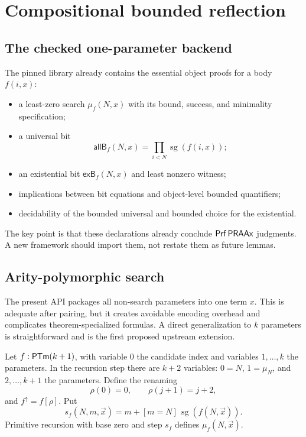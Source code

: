 \section{Compositional bounded reflection}\label{sec:reflection}

\subsection{The checked one-parameter backend}

The pinned library already contains the essential object proofs for a body \(f(i,x)\):

\begin{itemize}
\item a least-zero search \(\mu_f(N,x)\) with its bound, success, and minimality specification;
\item a universal bit
\[
 \mathsf{allB}_f(N,x)=\prod_{i<N}\operatorname{sg}(f(i,x));
\]
\item an existential bit \(\mathsf{exB}_f(N,x)\) and least nonzero witness;
\item implications between bit equations and object-level bounded quantifiers;
\item decidability of the bounded universal and bounded choice for the existential.
\end{itemize}

The key point is that these declarations already conclude \(\mathsf{Prf}\,\mathsf{PRAAx}\) judgments.  A new
framework should import them, not restate them as future lemmas.

\subsection{Arity-polymorphic search}\label{subsec:searchk}

The present API packages all non-search parameters into one term \(x\).  This is adequate after
pairing, but it creates avoidable encoding overhead and complicates theorem-specialized formulas.
A direct generalization to \(k\) parameters is straightforward and is the first proposed upstream
extension.

Let \(f:\mathsf{PTm}(k+1)\), with variable \(0\) the candidate index and variables
\(1,\ldots,k\) the parameters.  In the recursion step there are \(k+2\) variables:
\(0=N\), \(1=\mu_N\), and \(2,\ldots,k+1\) the parameters.  Define the renaming
\[
 \rho(0)=0,\qquad \rho(j+1)=j+2,
\]
and \(f^{\uparrow}=f[\rho]\).  Put
\[
 s_f(N,m,\vec x)=m+[m=N]\,\operatorname{sg}(f(N,\vec x)).
\]
Primitive recursion with base zero and step \(s_f\) defines
\(\mu_f(N,\vec x)\).


